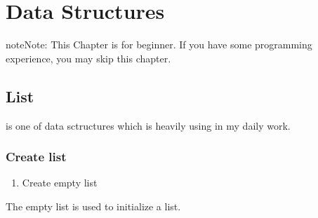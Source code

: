 \documentclass[letterpaper,12pt,english]{sphinxmanual}
\begin{document}

\begin{sphinxVerbatim}[commandchars=\\\{\}]

\end{sphinxVerbatim}


\chapter{Data Structures}
\label{\detokenize{struct:data-structures}}\label{\detokenize{struct:struct}}\label{\detokenize{struct::doc}}
\begin{sphinxadmonition}{note}{Note:}
This Chapter {\hyperref[\detokenize{struct:struct}]{}} is for beginner.  If you have some  programming experience, you may skip this chapter.
\end{sphinxadmonition}


\section{List}
\label{\detokenize{struct:list}}
 is one of data sctructures which is heavily using in my daily work.


\subsection{Create list}
\label{\detokenize{struct:create-list}}\begin{enumerate}
\def\theenumi{\arabic{enumi}}
\def\labelenumi{\theenumi .}
\makeatletter\def\p@enumii{\p@enumi \theenumi .}\makeatother
\item {} 
Create empty list

\end{enumerate}

The empty list is used to initialize a list.

\begin{quote}

\begin{sphinxVerbatim}[commandchars=\\\{\}]
  \PYG{p}{[}\PYG{p}{]}
\end{sphinxVerbatim}
\end{quote}
\end{document}
